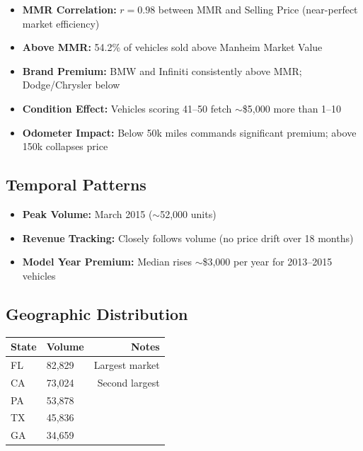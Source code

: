 \documentclass[12pt,a4paper]{article}
\begin{document}
\begin{itemize}
    \item \textbf{MMR Correlation:} $r = 0.98$ between MMR and Selling Price (near-perfect market efficiency)
    \item \textbf{Above MMR:} 54.2\% of vehicles sold above Manheim Market Value
    \item \textbf{Brand Premium:} BMW and Infiniti consistently above MMR; Dodge/Chrysler below
    \item \textbf{Condition Effect:} Vehicles scoring 41--50 fetch $\sim$\$5,000 more than 1--10
    \item \textbf{Odometer Impact:} Below 50k miles commands significant premium; above 150k collapses price
\end{itemize}

\subsection{Temporal Patterns}

\begin{itemize}
    \item \textbf{Peak Volume:} March 2015 ($\sim$52,000 units)
    \item \textbf{Revenue Tracking:} Closely follows volume (no price drift over 18 months)
    \item \textbf{Model Year Premium:} Median rises $\sim$\$3,000 per year for 2013--2015 vehicles
\end{itemize}

\subsection{Geographic Distribution}

\begin{center}
\begin{tabular}{llr}
\toprule
\textbf{State} & \textbf{Volume} & \textbf{Notes} \\
\midrule
FL & 82,829 & Largest market \\
CA & 73,024 & Second largest \\
PA & 53,878 &  \\
TX & 45,836 &  \\
GA & 34,659 &  \\
\bottomrule
\end{tabular}
\end{center}

\end{document}
